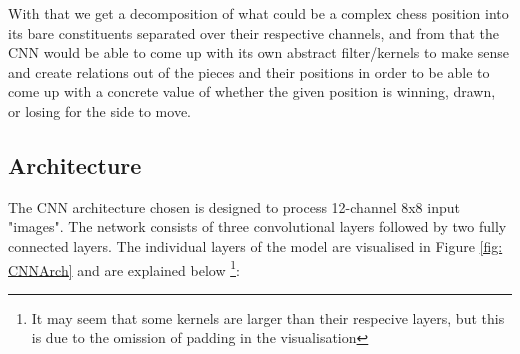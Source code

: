 With that we get a decomposition of what could be a complex chess position into its bare constituents separated over their respective channels, and from that the CNN would be able to come up with its own abstract filter/kernels to make sense and create relations out of the pieces and their positions in order to be able to come up with a concrete value of whether the given position is winning, drawn, or losing for the side to move.

\subsection{Architecture}
The CNN architecture chosen is designed to process 12-channel 8x8 input "images". The network consists of three convolutional layers followed by two fully connected layers. The individual layers of the model are visualised in Figure \ref{fig: CNNArch} and are explained below \footnote{It may seem that some kernels are larger than their respecive layers, but this is due to the omission of padding in the visualisation}:

